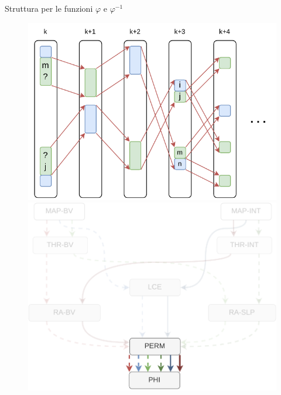 \documentclass[]{beamer}
\def\rank{\mbox{\rm {\sf rank}}}
\begin{document}
\begin{frame}{Struttura per le funzioni $\varphi$ e $\varphi^{-1}$}
  \begin{figure}[H]
    \centering
    \includegraphics[scale = 0.65, valign=t]{img/phi.pdf}
    \includegraphics[scale = 0.28, valign=t]{img/mini_phi4.pdf}
  \end{figure}
  
\end{frame}
\end{document}

